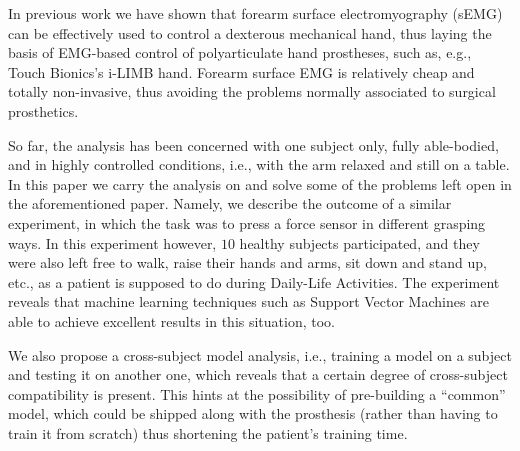 In previous work \cite{2008.ICRA,2008.BioCyb} we have shown that
forearm surface electromyography (sEMG) can be effectively used to
control a dexterous mechanical hand, thus laying the basis of
EMG-based control of polyarticulate hand prostheses, such as, e.g.,
Touch Bionics's i-LIMB hand. Forearm surface EMG is relatively cheap
and totally non-invasive, thus avoiding the problems normally
associated to surgical prosthetics.

So far, the analysis has been concerned with one subject only, fully
able-bodied, and in highly controlled conditions, i.e., with the arm
relaxed and still on a table. In this paper we carry the analysis on
and solve some of the problems left open in the aforementioned
paper. Namely, we describe the outcome of a similar experiment, in
which the task was to press a force sensor in different grasping
ways. In this experiment however, $10$ healthy subjects participated,
and they were also left free to walk, raise their hands and arms, sit
down and stand up, etc., as a patient is supposed to do during
Daily-Life Activities. The experiment reveals that machine learning
techniques such as Support Vector Machines are able to achieve
excellent results in this situation, too.

We also propose a cross-subject model analysis, i.e., training a model
on a subject and testing it on another one, which reveals that a
certain degree of cross-subject compatibility is present. This hints
at the possibility of pre-building a ``common'' model, which could be
shipped along with the prosthesis (rather than having to train it from
scratch) thus shortening the patient's training time.